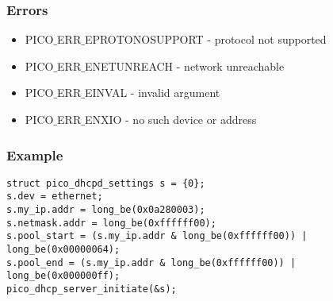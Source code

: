 \subsubsection*{Errors}
\begin{itemize}[noitemsep]
\item PICO$\_$ERR$\_$EPROTONOSUPPORT - protocol not supported
\item PICO$\_$ERR$\_$ENETUNREACH - network unreachable 
\item PICO$\_$ERR$\_$EINVAL - invalid argument
\item PICO$\_$ERR$\_$ENXIO - no such device or address
\end{itemize}

\subsubsection*{Example}
\begin{verbatim}
struct pico_dhcpd_settings s = {0};
s.dev = ethernet;
s.my_ip.addr = long_be(0x0a280003);
s.netmask.addr = long_be(0xffffff00);
s.pool_start = (s.my_ip.addr & long_be(0xffffff00)) | long_be(0x00000064);
s.pool_end = (s.my_ip.addr & long_be(0xffffff00)) | long_be(0x000000ff);
pico_dhcp_server_initiate(&s);
\end{verbatim}



